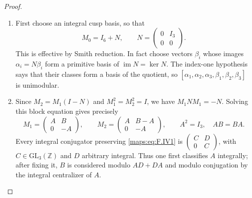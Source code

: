 \documentclass[11pt,a4paper]{article}
\theoremstyle{definition}
\begin{document}
\begin{proof}
\begin{enumerate}[label=\arabic*.]
\item First choose an integral cusp basis, so that
\[
 M_0=I_6+N,\qquad N=\begin{pmatrix}0&I_3\\0&0\end{pmatrix}.
                                                               \tag{F.IV1}\label{maps:eq:F.IV1}
\]
This is effective by Smith reduction.  In fact choose vectors
$\beta_i$ whose images $\alpha_i=N\beta_i$ form a primitive
basis of $\operatorname{im}N=\ker N$.
The index-one hypothesis says that their classes form a basis
of the quotient, so $[\alpha_1,\alpha_2,\alpha_3,
\beta_1,\beta_2,\beta_3]$ is unimodular.

\item Since $M_2=M_1(I-N)$ and $M_1^2=M_2^2=I$, we have
$M_1NM_1=-N$.  Solving this block equation gives precisely
\[
 M_1=\begin{pmatrix}A&B\\0&-A\end{pmatrix},\qquad
 M_2=\begin{pmatrix}A&B-A\\0&-A\end{pmatrix},\qquad
 A^2=I_3,\quad AB=BA.                                     \tag{F.IV2}\label{maps:eq:F.IV2}
\]
Every integral conjugator preserving \eqref{maps:eq:F.IV1} is
$\begin{pmatrix}C&D\\0&C\end{pmatrix}$, with
$C\in\mathrm{GL}_3(\mathbb Z)$ and $D$ arbitrary integral.
Thus one first classifies $A$ integrally; after fixing it,
$B$ is considered modulo $AD+DA$ and modulo conjugation by
the integral centralizer of $A$.


\end{enumerate}
\end{proof}
\end{document}
